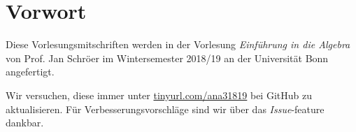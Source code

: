 \chapter*{Vorwort}
Diese Vorlesungsmitschriften werden in der Vorlesung \textit{Einführung in die Algebra} von Prof. Jan Schröer im Wintersemester 2018/19 an der Universität Bonn angefertigt.\par
Wir versuchen, diese immer unter \url{tinyurl.com/ana31819} bei GitHub zu aktualisieren. Für Verbesserungsvorschläge sind wir über das \textit{Issue}-feature dankbar.